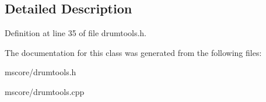 \subsection{Detailed Description}


Definition at line 35 of file drumtools.\+h.



The documentation for this class was generated from the following files\+:\begin{DoxyCompactItemize}
\item 
mscore/drumtools.\+h\item 
mscore/drumtools.\+cpp\end{DoxyCompactItemize}

